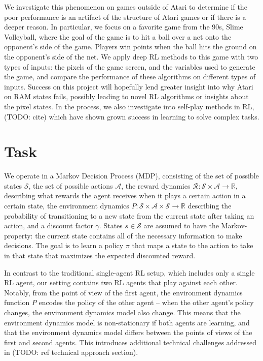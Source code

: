 \documentclass[10pt,twocolumn,letterpaper]{article}
\begin{document}
We investigate this phenomenon on games outside of Atari to determine
if the poor performance is an artifact of the structure of Atari games or if
there is a deeper reason. In particular, we focus on a favorite game from the
90s, Slime Volleyball, where the goal of the game is to hit a ball over a net
onto the opponent's side of the game. Players win points when the ball hits the
ground on the opponent's side of the net. We apply deep RL methods to
this game with two types of inputs: the pixels of the game screen, and the
variables used to generate the game, and compare the performance of these
algorithms on different types of inputs. Success on this project will hopefully
lend greater insight into why Atari on RAM states fails, possibly leading to
novel RL algorithms or insights about the pixel states. In the process, we
also investigate into self-play methods in RL, (TODO: cite) which have shown
grown success in learning to solve complex tasks.

\section{Task}

We operate in a Markov Decision Process (MDP), consisting of the set of
possible states $\mathcal{S}$, the set of possible actions $\mathcal{A}$, the
reward dynamics $\mathcal{R}: \mathcal{S} \times \mathcal{A} \to \mathbb{R}$,
describing what rewards the agent receives when it plays a certain action in a
certain state, the environment dynamics $P: \mathcal{S} \times \mathcal{A}
\times \mathcal{S} \to \mathbb{R}$ describing the probability of transitioning
to a new state from the current state after taking an action, and a discount
factor $\gamma$. States $s \in \mathcal{S}$ are assumed to have the
Markov-property: the current state contains all of the necessary information to make
decisions. The goal is to learn a policy $\pi$ that maps a state to the action
to take in that state that maximizes the expected discounted reward.

In contrast to the traditional single-agent RL setup, which includes only a
single RL agent, our setting contains two RL agents that play against each
other. Notably, from the point of view of the first agent, the environment
dynamics function $P$ encodes the policy of the other agent -- when the other
agent's policy changes, the environment dynamics model also change. This means
that the environment dynamics model is non-stationary if both agents are
learning, and that the environment dynamics model differs between the points
of views of the first and second agents. This introduces additional technical
challenges addressed in (TODO: ref technical approach section).
\end{document}
